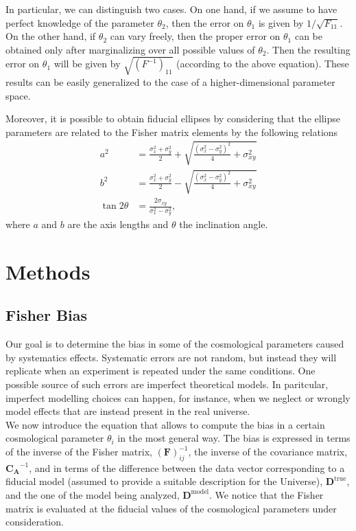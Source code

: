 \documentclass[modern]{lsstdescnote}
\begin{document}
In particular, we can distinguish two cases.
On one hand, if we assume to have perfect knowledge of the parameter $\theta_2$, then the error on $\theta_1$ is given by $1/\sqrt{F_{11}}$. 
On the other hand, if $\theta_2$ can vary freely, then the proper error on $\theta_1$ can be obtained only after
marginalizing over all possible values of $\theta_2$.
Then the resulting error on $\theta_1$ will be given by $\sqrt{\left(F^{-1}\right)_{11}}$ (according to the above equation). 
These results can be easily generalized to the case of a higher-dimensional parameter space.

Moreover, it is possible to obtain fiducial ellipses by considering
that the ellipse parameters are related to the Fisher matrix elements by the following relations
\begin{align}
  a^{2} &=\frac{\sigma_{x}^{2}+\sigma_{y}^{2}}{2}+\sqrt{\frac{\left(\sigma_{x}^{2}-\sigma_{y}^{2}\right)^{2}}{4}+\sigma_{x y}^{2}} \\
  b^{2} &=\frac{\sigma_{x}^{2}+\sigma_{y}^{2}}{2}-\sqrt{\frac{\left(\sigma_{x}^{2}-\sigma_{y}^{2}\right)^{2}}{4}+\sigma_{x y}^{2}} \\
  \tan 2 \theta &=\frac{2 \sigma_{x y}}{\sigma_{x}^{2}-\sigma_{y}^{2}},
\end{align}
where $a$ and $b$ are the axis lengths and $\theta$ the inclination angle.

\section{Methods}
\subsection{Fisher Bias}
Our goal is to determine the bias in some of the cosmological parameters caused by systematics effects. 
Systematic errors are not random, but instead they will replicate when an experiment is repeated under the same conditions.
One possible source of such errors are imperfect theoretical models. In paritcular, imperfect modelling choices 
can happen, for instance, when we neglect or wrongly model effects that are instead present in the real universe.\\

We now introduce the equation that allows to compute the bias in a certain cosmological parameter $\theta_i$ in the most general way. 
The bias is expressed in terms of the inverse of the Fisher matrix, $(\boldsymbol{F})^{-1}_{ij}$, the inverse of the covariance matrix, $\boldsymbol{C_A}^{-1}$, and in terms of the difference between the data vector
corresponding to a fiducial model (assumed to provide a suitable description for the Universe), $\boldsymbol{D}^{\mathrm{true}}$, and the one of the model being analyzed, $\boldsymbol{D}^{\mathrm{model}}$.
We notice that the Fisher matrix is evaluated at the fiducial values of the cosmological parameters under consideration.
\end{document}
